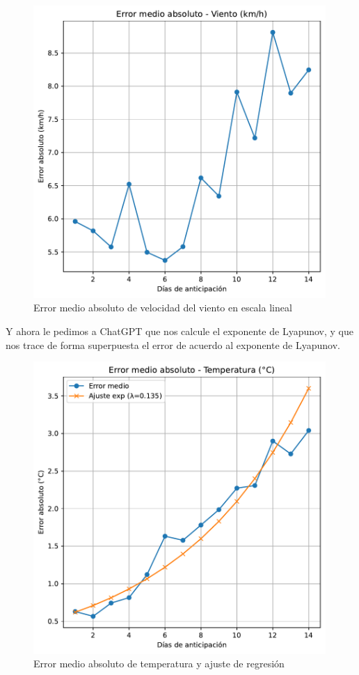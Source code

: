 \documentclass[
  10pt,
  a4paper,
  DIV=11,
  numbers=noendperiod,
  open=any]{scrreprt}
\numberwithin{equation}{chapter}
\numberwithin{equation}{section}
\renewcommand{\[}{\begin{equation}}
\renewcommand{\]}{\end{equation}}
\begin{document}
\begin{figure}[h]
  \centering
  \includegraphics[width=0.99\textwidth]{03-meteorologia/predicciones_files/figure-pdf/cell-3-output-4.pdf}
  \caption{Error medio absoluto de velocidad del viento en escala lineal}
\end{figure}


Y ahora le pedimos a ChatGPT que nos calcule el exponente de Lyapunov, y
que nos trace de forma superpuesta el error de acuerdo al exponente de
Lyapunov.


\begin{figure}[h]
  \centering
  \includegraphics[width=0.99\textwidth]{03-meteorologia/predicciones_files/figure-pdf/cell-4-output-1.pdf}
  \caption{Error medio absoluto de temperatura y ajuste de regresión}
\end{figure}
\end{document}
